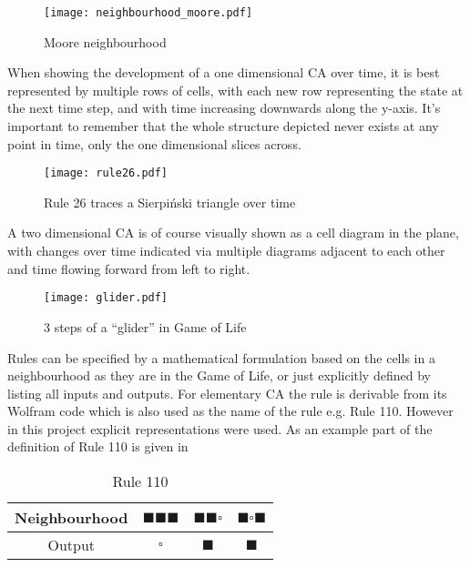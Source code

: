 \begin{figure}[h]
    \centering
    \texttt{[image: neighbourhood\_moore.pdf]}
    \caption{Moore neighbourhood}
    \label{fig:moore}
\end{figure}

When showing the development of a one dimensional CA over time,
it is best represented by multiple rows of cells, 
with each new row representing the state at the next time step,
and with time increasing downwards along the y-axis.
It's important to remember that the whole structure depicted never exists at any point in time,
only the one dimensional slices across.

\begin{figure}[h]
    \centering
    \texttt{[image: rule26.pdf]}
    \caption{Rule 26 traces a Sierpi\'{n}ski triangle over time}
    \label{fig:rule26}
\end{figure}

A two dimensional CA is of course visually shown as a cell diagram in the plane,
with changes over time indicated via multiple diagrams adjacent to each other
and time flowing forward from left to right.

\begin{figure}[h]
    \centering
    \texttt{[image: glider.pdf]}
    \caption{3 steps of a ``glider'' in Game of Life}
    \label{fig:glider}
\end{figure}

Rules can be specified by a mathematical formulation based on the cells in a neighbourhood as they are in the Game of Life,
or just explicitly defined by listing all inputs and outputs.
For elementary CA the rule is derivable from its Wolfram code which is also used as the name of the rule e.g. Rule 110.
However in this project explicit representations were used.
As an example part of the definition of Rule 110 is given in 

\begin{table}[htbp]
    \centering
    \begin{tabular}{c|ccc}
        Neighbourhood & $\blacksquare \blacksquare \blacksquare$ & $\blacksquare \blacksquare \square$ & $\blacksquare \square \blacksquare$  \\
         \hline
         Output & $\square$ & $\blacksquare$ & $\blacksquare$
    \end{tabular}
    \caption{Rule 110}
    \label{table:rule110}
\end{table}


